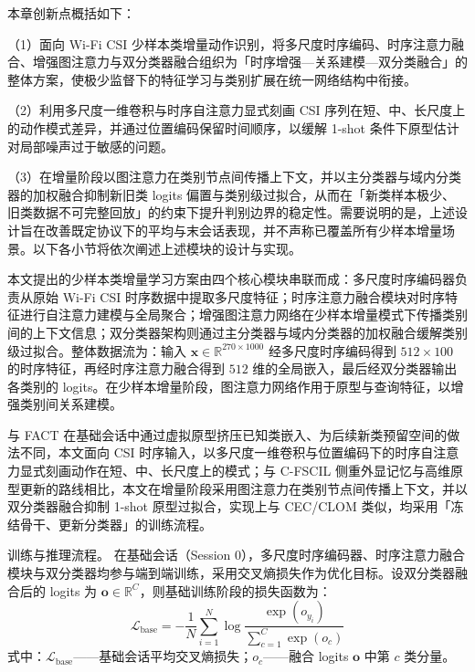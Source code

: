 本章创新点概括如下：

（1）面向 Wi-Fi CSI 少样本类增量动作识别，将多尺度时序编码、时序注意力融合、增强图注意力与双分类器融合组织为「时序增强—关系建模—双分类融合」的整体方案，使极少监督下的特征学习与类别扩展在统一网络结构中衔接。

（2）利用多尺度一维卷积与时序自注意力显式刻画 CSI 序列在短、中、长尺度上的动作模式差异，并通过位置编码保留时间顺序，以缓解 1-shot 条件下原型估计对局部噪声过于敏感的问题。

（3）在增量阶段以图注意力在类别节点间传播上下文，并以主分类器与域内分类器的加权融合抑制新旧类 logits 偏置与类别级过拟合，从而在「新类样本极少、旧类数据不可完整回放」的约束下提升判别边界的稳定性。需要说明的是，上述设计旨在改善既定协议下的平均与末会话表现，并不声称已覆盖所有少样本增量场景。以下各小节将依次阐述上述模块的设计与实现。


本文提出的少样本类增量学习方案由四个核心模块串联而成：多尺度时序编码器负责从原始 Wi-Fi CSI 时序数据中提取多尺度特征；时序注意力融合模块对时序特征进行自注意力建模与全局聚合；增强图注意力网络在少样本增量模式下传播类别间的上下文信息；双分类器架构则通过主分类器与域内分类器的加权融合缓解类别级过拟合。整体数据流为：输入 $\mathbf{x} \in \mathbb{R}^{270 \times 1000}$ 经多尺度时序编码得到 $512 \times 100$ 的时序特征，再经时序注意力融合得到 $512$ 维的全局嵌入，最后经双分类器输出各类别的 logits。在少样本增量阶段，图注意力网络作用于原型与查询特征，以增强类别间关系建模。

与 FACT\cite{zhou2022fact} 在基础会话中通过虚拟原型挤压已知类嵌入、为后续新类预留空间的做法不同，本文面向 CSI 时序输入，以多尺度一维卷积与位置编码下的时序自注意力显式刻画动作在短、中、长尺度上的模式；与 C-FSCIL\cite{hersche2022cfscil} 侧重外显记忆与高维原型更新的路线相比，本文在增量阶段采用图注意力在类别节点间传播上下文，并以双分类器融合抑制 1-shot 原型过拟合，实现上与 CEC/CLOM 类似，均采用「冻结骨干、更新分类器」的训练流程。

训练与推理流程。 在基础会话（Session 0），多尺度时序编码器、时序注意力融合模块与双分类器均参与端到端训练，采用交叉熵损失作为优化目标。设双分类器融合后的 logits 为 $\mathbf{o} \in \mathbb{R}^C$，则基础训练阶段的损失函数为：
\begin{equation}\label{eq:ch4-Lbase}
  \mathcal{L}_{\mathrm{base}} = -\frac{1}{N}\sum_{i=1}^{N}\log\frac{\exp(o_{y_i})}{\sum_{c=1}^{C}\exp(o_c)}
\end{equation}
\noindent 式中：$\mathcal{L}_{\mathrm{base}}$——基础会话平均交叉熵损失；$o_c$——融合 logits $\mathbf{o}$ 中第 $c$ 类分量。

